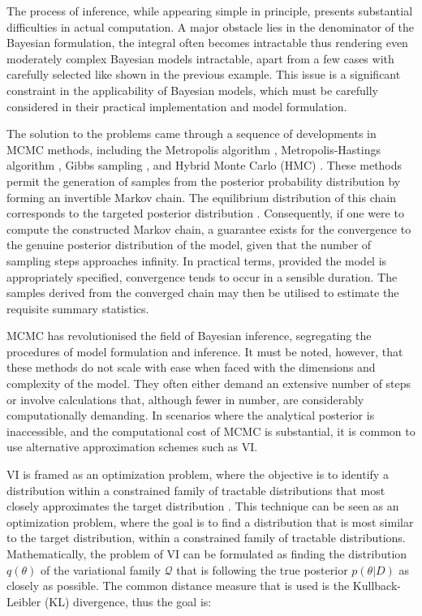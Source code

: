 The process of inference, while appearing simple in principle, presents substantial difficulties in actual computation. A major obstacle lies in the denominator of the Bayesian formulation, the integral often becomes intractable  thus rendering even moderately complex Bayesian models intractable, apart from a few cases with carefully selected  like shown in the previous example. This issue is a significant constraint in the applicability of Bayesian models, which must be carefully considered in their practical implementation and model formulation.

The solution to the problems came through a sequence of developments in \ac{MCMC} methods, including the Metropolis algorithm \parencite{Rosenbluth1953-gu}, Metropolis-Hastings algorithm \parencite{Hastings1970-mb}, Gibbs sampling \parencite{Geman1984-nk}, and Hybrid Monte Carlo (HMC) \parencite{Duane1987-gu}. These methods permit the generation of samples from the posterior probability distribution by forming an invertible Markov chain. The equilibrium distribution of this chain corresponds to the targeted posterior distribution \parencite{Roberts2004-op}. Consequently, if one were to compute the constructed Markov chain, a guarantee exists for the convergence to the genuine posterior distribution of the model, given that the number of sampling steps approaches infinity. In practical terms, provided the model is appropriately specified, convergence tends to occur in a sensible duration. The samples derived from the converged chain may then be utilised to estimate the requisite summary statistics. 

\ac{MCMC} has revolutionised the field of Bayesian inference, segregating the procedures of model formulation and inference. It must be noted, however, that these methods do not scale with ease when faced with the dimensions and complexity of the model. They often either demand an extensive number of steps or involve calculations that, although fewer in number, are considerably computationally demanding. In scenarios where the analytical posterior is inaccessible, and the computational cost of \ac{MCMC} is substantial, it is common to use alternative approximation schemes such as \ac{VI}.

\acl{VI} is framed as an optimization problem, where the objective is to identify a distribution within a constrained family of tractable distributions that most closely approximates the target distribution \parencite{Blei2017-dm}. This technique can be seen as an optimization problem, where the goal is to find a distribution that is most similar to the target distribution, within a constrained family of tractable distributions. Mathematically, the problem of \acl{VI} can be formulated as finding the distribution $q(\theta)$ of the variational family $\mathcal{Q}$ that is following the true posterior $p(\theta | D)$ as closely as possible. The common distance measure that is used is the Kullback-Leibler (KL) divergence, thus the goal is:


